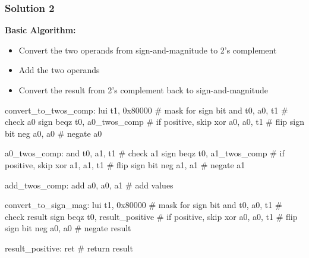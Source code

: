 \subsubsection{Solution 2}

\textbf{Basic Algorithm:}
\begin{itemize}
    \item Convert the two operands from sign-and-magnitude to 2's complement
    \item Add the two operands
    \item Convert the result from 2's complement back to sign-and-magnitude
\end{itemize}

\begin{assembly}
convert_to_twos_comp:
    lui     t1, 0x80000         # mask for sign bit
    and     t0, a0, t1          # check a0 sign
    beqz    t0, a0_twos_comp    # if positive, skip
    xor     a0, a0, t1          # flip sign bit
    neg     a0, a0              # negate a0

a0_twos_comp:
    and     t0, a1, t1          # check a1 sign
    beqz    t0, a1_twos_comp    # if positive, skip
    xor     a1, a1, t1          # flip sign bit
    neg     a1, a1              # negate a1

add_twos_comp:
    add     a0, a0, a1          # add values

convert_to_sign_mag:
    lui     t1, 0x80000         # mask for sign bit
    and     t0, a0, t1          # check result sign
    beqz    t0, result_positive # if positive, skip
    xor     a0, a0, t1          # flip sign bit
    neg     a0, a0              # negate result

result_positive:
    ret                         # return result
\end{assembly}














